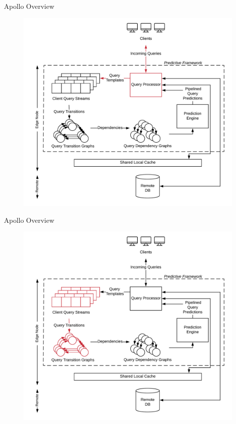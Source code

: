 \documentclass[10pt]{beamer}
\begin{document}
\begin{frame}[fragile]{Apollo Overview}
    \begin{figure}
        \hspace*{-1cm}
        \includegraphics[scale=0.13]{apollo_overview_2}
    \end{figure}
\end{frame}

\begin{frame}[fragile]{Apollo Overview}
    \begin{figure}
        \hspace*{-1cm}
        \includegraphics[scale=0.13]{apollo_overview_3}
    \end{figure}
\end{frame}
\end{document}
